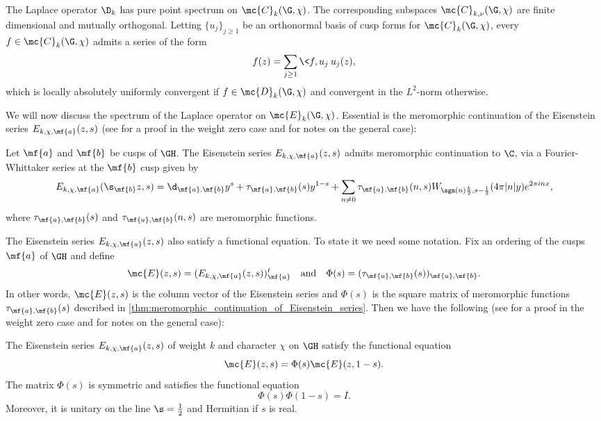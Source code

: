     \begin{theorem}\label{thm:cusp_form_spectrum}
      The Laplace operator $\D_{k}$ has pure point spectrum on $\mc{C}_{k}(\G,\chi)$. The corresponding subspaces $\mc{C}_{k,\nu}(\G,\chi)$ are finite dimensional and mutually orthogonal. Letting $\{u_{j}\}_{j \ge 1}$ be an orthonormal basis of cusp forms for $\mc{C}_{k}(\G,\chi)$, every $f \in \mc{C}_{k}(\G,\chi)$ admits a series of the form
      \[
        f(z) = \sum_{j \ge 1}\<f,u_{j}\>u_{j}(z),
      \]
      which is locally absolutely uniformly convergent if $f \in \mc{D}_{k}(\G,\chi)$ and convergent in the $L^{2}$-norm otherwise.
    \end{theorem}

    We will now discuss the spectrum of the Laplace operator on $\mc{E}_{k}(\G,\chi)$. Essential is the meromorphic continuation of the Eisenstein series $E_{k,\chi,\mf{a}}(z,s)$ (see \cite{iwaniec2002spectral} for a proof in the weight zero case and \cite{duke2002subconvexity} for notes on the general case):

    \begin{theorem}\label{thm:meromorphic_continuation_of_Eisenstein_series}
      Let $\mf{a}$ and $\mf{b}$ be cusps of $\GH$. The Eisenstein series $E_{k,\chi,\mf{a}}(z,s)$ admits meromorphic continuation to $\C$, via a Fourier-Whittaker series at the $\mf{b}$ cusp given by
      \[
        E_{k,\chi,\mf{a}}(\s_{\mf{b}}z,s) = \d_{\mf{a},\mf{b}}y^{s}+\tau_{\mf{a},\mf{b}}(s)y^{1-s}+\sum_{n \neq 0}\tau_{\mf{a},\mf{b}}(n,s)W_{\sgn(n)\frac{k}{2},s-\frac{1}{2}}(4\pi|n|y)e^{2\pi inx},
      \]
      where $\tau_{\mf{a},\mf{b}}(s)$ and $\tau_{\mf{a},\mf{b}}(n,s)$ are meromorphic functions.
    \end{theorem}

    The Eisenstein series $E_{k,\chi,\mf{a}}(z,s)$ also satisfy a functional equation. To state it we need some notation. Fix an ordering of the cusps $\mf{a}$ of $\GH$ and define
    \[
      \mc{E}(z,s) = (E_{k,\chi,\mf{a}}(z,s))_{\mf{a}}^{t} \quad \text{and} \quad \Phi(s) = (\tau_{\mf{a},\mf{b}}(s))_{\mf{a},\mf{b}}.
    \]
    In other words, $\mc{E}(z,s)$ is the column vector of the Eisenstein series and $\Phi(s)$ is the square matrix of meromorphic functions $\tau_{\mf{a},\mf{b}}(s)$ described in \cref{thm:meromorphic_continuation_of_Eisenstein_series}. Then we have the following (see \cite{iwaniec2002spectral} for a proof in the weight zero case and \cite{duke2002subconvexity} for notes on the general case): 

    \begin{theorem}\label{thm:functional_equation_of_Eisenstein_series}
      The Eisenstein series $E_{k,\chi,\mf{a}}(z,s)$ of weight $k$ and character $\chi$ on $\GH$ satisfy the functional equation 
      \[
        \mc{E}(z,s) = \Phi(s)\mc{E}(z,1-s).
      \]
      The matrix $\Phi(s)$ is symmetric and satisfies the functional equation
      \[
        \Phi(s)\Phi(1-s) = I.
      \]
      Moreover, it is unitary on the line $\s = \frac{1}{2}$ and Hermitian if $s$ is real.
    \end{theorem}

